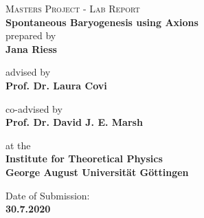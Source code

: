 \documentclass[13pt,a4paper,titlepage]{article}
\begin{document}
\begin{titlepage}

\vspace*{3cm}

\centering
\textsc{\Large Masters Project - Lab Report}
\\
\vspace*{1cm}
{\Large \bfseries
Spontaneous Baryogenesis using Axions
\\[0.1cm]}
\vspace*{1cm}
{
\centering\Large
prepared by\\[0.2cm]
{\bfseries Jana Riess}\\[0.2cm]
}

\vspace*{1cm}
{
    \centering\Large
    advised by\\[0.2cm]
    {\bfseries Prof. Dr. Laura Covi}\\[0.2cm]
}

\vspace*{1cm}
{
    \centering\Large
    co-advised by\\[0.2cm]
    {\bfseries Prof. Dr. David J. E. Marsh}\\[0.2cm]
}

\vspace*{1cm}
{
    \centering\Large
    at the\\[0.2cm]
    {\bfseries Institute for Theoretical Physics \\ George August Universität Göttingen}\\[0.2cm]
}

\vspace*{1cm}
{
    \centering\Large
    Date of Submission:\\[0.2cm]
    {\bfseries 30.7.2020}\\[0.2cm]
}




\vspace*{2cm}

\begin{Large}
\begin{tabular}{ll}
\end{tabular}
\end{Large}

\vspace*{1.5cm}

\end{titlepage}
\end{document}
